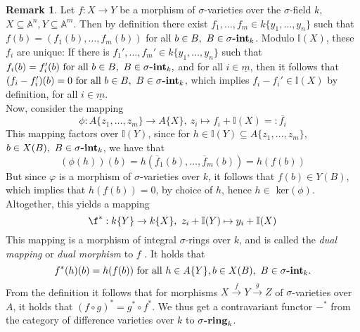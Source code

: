 \documentclass{article}
\def\I{\mathbb{I}}
\def\s{\sigma}
\def\fa{\text{ for all }}
\newcommand{\catname}[1]{{\normalfont\textbf{#1}}}
\newcommand{\sintk}{\s\text{\catname{-int}}_k}
\newcommand{\sringk}{\s\text{\catname{-ring}}_k}
\theoremstyle{plain}
\theoremstyle{definition}
\newtheorem{rem}[Satz]{Remark}
\begin{document}
\begin{rem}\label{dualmor}
Let $f: X \rightarrow Y$ be a morphism of $\s$-varieties over the $\s$-field $k$, $X \subseteq \mathbb{A}^n, Y \subseteq \mathbb{A}^m$. Then by definition there exist $f_1, \ldots, f_m \in k\{y_1,\ldots,y_n\}$ such 
that $f(b) = (f_1(b),\ldots,f_m(b))$ for all $b \in B, ~ B \in \sintk$. Modulo $\I(X)$, these $f_i$ are unique:
 If there is $f_1', \ldots, f_m' \in k\{y_1,\ldots,y_n\}$ such that $f_i(b) = f'_i(b) \fa b \in B, ~ B \in \sintk,$ and for all $i \in \underline{m}$,
then it follows that $(f_i - f_i')(b) = 0 \fa b \in B, ~ B \in \sintk$, which implies $f_i - f_i' \in \I(X)$ by definition, for all $i \in \underline{m}$. \\
\indent Now, consider the mapping \[ \phi: A\{z_1,\ldots,z_m \} \rightarrow A\{X\}, ~ z_i \mapsto f_i + \I(X) =: \overline{f_i} \]
This mapping factors over $\I(Y)$, since for $h \in \I(Y) \subseteq A\{z_1,\ldots,z_m\}$, $b \in X(B), ~ B \in \sintk$, we have that 
\[ (\phi(h))(b) = h(\overline f_1(b), \ldots, \overline f_m(b)) = h(f(b)) \]
But since $\varphi$ is a morphism of $\s$-varieties over $k$, it follows that $f(b) \in Y(B)$, which implies that $h(f(b)) = 0$, by choice of $h$, hence $h \in $ ker$(\phi)$.
Altogether, this yields a mapping 
\[ \f^* : k\{Y\} \rightarrow k\{X\}, ~ z_i + \I(Y) \mapsto y_i + \I(X) \]
This mapping is a morphism of integral $\s$-rings over $k$, and is called the \emph{dual mapping} or \emph{dual morphism} to $f$ . It holds that
\[ f^*(h)(b) = h(f(b)) \fa h \in A\{Y\}, b \in X(B), ~ B \in \sintk. \]
From the definition it follows that for morphisms $X \xrightarrow{f} Y \xrightarrow{g} Z$ of $\s$-varieties over $A$, it holds that $ (f \circ g)^* = g^* \circ f^*$. 
We thus get a contravariant functor $-^*$ from the category of difference varieties over $k$ to $\sringk$.
\end{rem}
\end{document}
